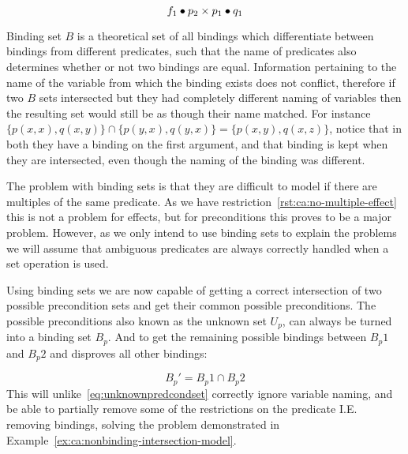 \documentclass[../Master.tex]{subfiles}
\begin{document}
\begin{example}
    \begin{equation*}
        f_1 \bullet p_2 \times p_1 \bullet q_1
    \end{equation*}
\end{example}

\begin{definition}\label{thm:ca:binding-set}
	Binding set $B$ is a theoretical set of all bindings which differentiate between bindings from different predicates, such that the name of predicates also determines whether or not two bindings are equal. Information pertaining to the name of the variable from which the binding exists does not conflict, therefore if two $B$ sets intersected but they had completely different naming of variables then the resulting set would still be as though their name matched.
	For instance $\{p(x,x), q(x,y)\} \cap \{p(y,x), q(y,x)\} = \{p(x,y), q(x,z)\}$, notice that in both they have a binding on the first argument, and that binding is kept when they are intersected, even though the naming of the binding was different.
\end{definition}
The problem with binding sets is that they are difficult to model if there are multiples of the same predicate. As we have restriction~\ref{rst:ca:no-multiple-effect} this is not a problem for effects, but for preconditions this proves to be a major problem. However, as we only intend to use binding sets to explain the problems we will assume that ambiguous predicates are always correctly handled when a set operation is used.

Using binding sets we are now capable of getting a correct intersection of two possible precondition sets and get their common possible preconditions. The possible preconditions also known as the unknown set $U_p$, can always be turned into a binding set $B_p$.
And to get the remaining possible bindings between $B_p1$ and $B_p2$ and disproves all other bindings:

\begin{equation}
B_p' = B_p1 \cap B_p2
\end{equation}
This will unlike~\eqref{eq:unknownpredcondset} correctly ignore variable naming, and be able to partially remove some of the restrictions on the predicate I.E. removing bindings, solving the problem demonstrated in Example~\ref{ex:ca:nonbinding-intersection-model}.
\end{document}

